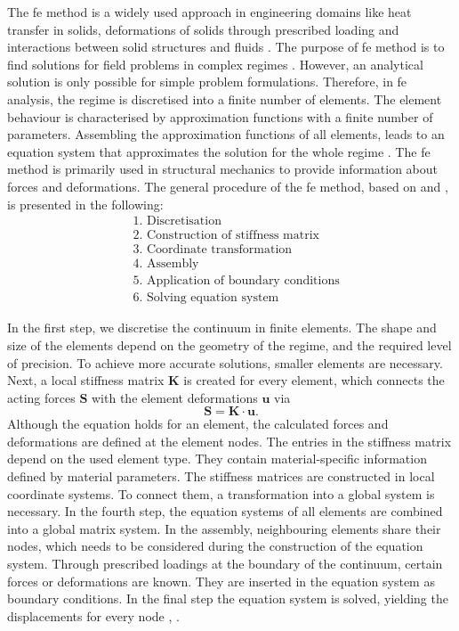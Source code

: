 The \acrfull{fe} method is a widely used approach in engineering domains like heat transfer in solids, deformations of solids through prescribed loading and interactions between solid structures and fluids \cite{jung_methode_2013}. 
The purpose of \acrshort{fe} method is to find solutions for field problems in complex regimes \cite{willner_vorlesungsskript_nodate}. However, an analytical solution is only possible for simple problem formulations. Therefore, in \acrshort{fe} analysis, the regime is discretised into a finite number of elements. The element behaviour is characterised by approximation functions with a finite number of parameters. Assembling the approximation functions of all elements, leads to an equation system that approximates the solution for the whole regime \cite{jagota_finite_nodate}. The \acrshort{fe} method is primarily used in structural mechanics to provide information about forces and deformations. The general procedure of the \acrshort{fe} method, based on \citet{willner_vorlesungsskript_nodate} and \citet{steinke_finite-elemente-methode_2015}, is presented in the following: 
\begin{align*}
    &\text{1. Discretisation} \\
    &\text{2. Construction of stiffness matrix}\\ 
    &\text{3. Coordinate transformation} \\
    &\text{4. Assembly} \\
    &\text{5. Application of boundary conditions} \\
    &\text{6. Solving equation system}
\end{align*}

In the first step, we discretise the continuum in finite elements. The shape and size of the elements depend on the geometry of the regime, and the required level of precision. To achieve more accurate solutions, smaller elements are necessary. Next, a local stiffness matrix $\boldsymbol{K}$ is created for every element, which connects the acting forces $\boldsymbol{S}$ with the element deformations $\boldsymbol{u}$ via 
\begin{equation}
    \boldsymbol{S} =  \boldsymbol{K} \cdot \boldsymbol{u}.
\end{equation}
Although the equation holds for an element, the calculated forces and deformations are defined at the element nodes. The entries in the stiffness matrix depend on the used element type. They contain material-specific information defined by material parameters. The stiffness matrices are constructed in local coordinate systems. To connect them, a transformation into a global system is necessary. In the fourth step, the equation systems of all elements are combined into a global matrix system. In the assembly, neighbouring elements share their nodes, which needs to be considered during the construction of the equation system. Through prescribed loadings at the boundary of the continuum, certain forces or deformations are known. They are inserted in the equation system as boundary conditions. In the final step the equation system is solved, yielding the displacements for every node \cite{willner_vorlesungsskript_nodate}, \cite{jagota_finite_nodate}. 

